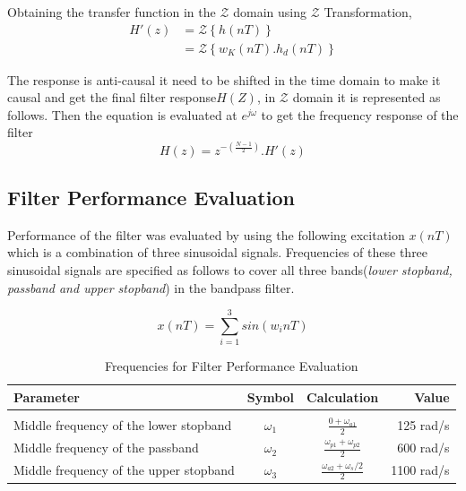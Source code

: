 \documentclass[a4paper,11pt]{article}%
\begin{document}
Obtaining the transfer function in the $\mathcal{Z}$ domain using $\mathcal{Z}$ Transformation,
\begin{equation}
	\begin{split}
			H'(z) &= \mathcal{Z}\left\{ h(nT) \right\}\\
		&=\mathcal{Z}\left\{ w_K(nT).h_d(nT) \right\}
	\end{split}
\end{equation}

The response is anti-causal it need to be shifted in the time domain to make it causal and get the final filter response$H(Z)$, in $\mathcal{Z}$ domain it is represented as follows. Then the equation is evaluated at $e^{j\omega}$ to get the frequency response of the filter
\begin{equation}
	H(z)= z^{-\left(\frac{N-1}{2}\right)}.H'(z)
\end{equation}

\subsection{Filter Performance Evaluation}

Performance of the filter was evaluated by using the following excitation $x(nT)$ which is a combination of three sinusoidal signals. Frequencies of these three sinusoidal signals are specified as follows to cover all three bands(\textit{lower stopband, passband and upper stopband}) in the bandpass filter.

\[x(nT) = \sum_{i=1}^{3}sin(w_inT)\]

\begin{table}[!h]
	\centering
	
	\begin{tabular}{l c c r}
		\hline
	\textbf{Parameter}& \textbf{Symbol}& \textbf{Calculation}&\textbf{Value}\\\hline
	&&&\\
	Middle frequency of the lower stopband& $\omega_1$&$\frac{0+ \omega_{a1}}{2}$&125 rad/s\\
	Middle frequency of the passband &$\omega_2$&$\frac{\omega_{p1}+\omega_{p2}}{2}$&600 rad/s\\
	Middle frequency of the upper stopband& $\omega_3$&$\frac{\omega_{a2}+\omega_s/2}{2}$&1100 rad/s\\
	\hline\hline
	\end{tabular}
\caption{Frequencies for Filter Performance Evaluation}
\end{table}
\end{document}
